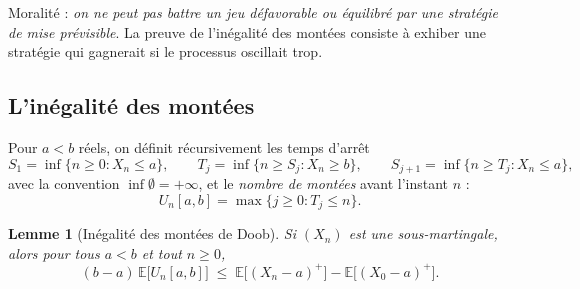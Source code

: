 \documentclass[11pt,a4paper]{article}
\theoremstyle{plain}
\newtheorem{lemma}[theorem]{Lemme}
\theoremstyle{definition}
\theoremstyle{remark}
\newcommand{\E}{\mathbb{E}}
\begin{document}
Moralité : \emph{on ne peut pas battre un jeu défavorable ou équilibré par une
stratégie de mise prévisible}. La preuve de l'inégalité des montées consiste à
exhiber une stratégie qui gagnerait si le processus oscillait trop.

\subsection{L'inégalité des montées}

Pour $a < b$ réels, on définit récursivement les temps d'arrêt
\[
S_1 = \inf\{n \ge 0 : X_n \le a\}, \qquad
T_j = \inf\{n \ge S_j : X_n \ge b\}, \qquad
S_{j+1} = \inf\{n \ge T_j : X_n \le a\},
\]
avec la convention $\inf \emptyset = +\infty$, et le \emph{nombre de montées}
avant l'instant $n$ :
\[
U_n[a,b] = \max\{j \ge 0 : T_j \le n\}.
\]

\begin{lemma}[Inégalité des montées de Doob]\label{lem:upcrossing}
Si $(X_n)$ est une sous-martingale, alors pour tous $a<b$ et tout $n \ge 0$,
\[
(b-a)\, \E\bigl[U_n[a,b]\bigr]
\;\le\;
\E\bigl[(X_n - a)^+\bigr] - \E\bigl[(X_0 - a)^+\bigr].
\]
\end{lemma}
\end{document}
